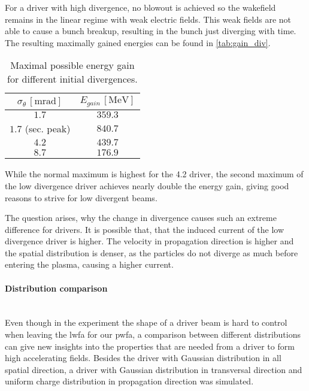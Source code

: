 \documentclass[bachelor_thesis]{subfiles}
\begin{document}
For a driver with high divergence, no blowout is achieved so the wakefield remains in the linear regime with weak electric fields. This weak fields are not able to cause a bunch breakup, resulting in the bunch just diverging with time.
The resulting maximally gained energies can be found in \autoref{tab:gain_div}.
\begin{table}[h]
\begin{center}
\begin{tabular}{|c|c|} 
	\hline
 	$\sigma_{\theta} \, \mathrm{[mrad]}$ & $E_{gain} \, \mathrm{[MeV]}$ \\ 
 	\hline
	$1.7$ & $359.3$ \\ 
	$1.7$ (sec. peak) & $840.7$ \\ 
 	$4.2$ & $439.7$ \\
	$8.7$ & $176.9$ \\
	\hline
\end{tabular}
\caption{Maximal possible energy gain for different initial divergences.}\label{tab:gain_div}
\end{center}
\end{table}
While the normal maximum is highest for the \qty{4.2}{\mrad} driver, the second maximum of the low divergence driver achieves nearly double the energy gain, giving good reasons to strive for low divergent beams.
 
The question arises, why the change in divergence causes such an extreme difference for drivers. It is possible that, that the induced current of the low divergence driver is higher. The velocity in propagation direction is higher and the spatial distribution
is denser, as the particles do not diverge as much before entering the plasma, causing a higher current. 


\paragraph*{Distribution comparison}\hspace{0pt} \\
Even though in the experiment the shape of a driver beam is hard to control when leaving the \gls{lwfa} for our \gls{pwfa}, a comparison between different distributions can give new insights into the properties that are needed from a driver
to form high accelerating fields. Besides the driver with Gaussian distribution in all spatial direction, a driver with Gaussian distribution in transversal direction and uniform charge distribution in propagation direction 
was simulated.
\end{document}
